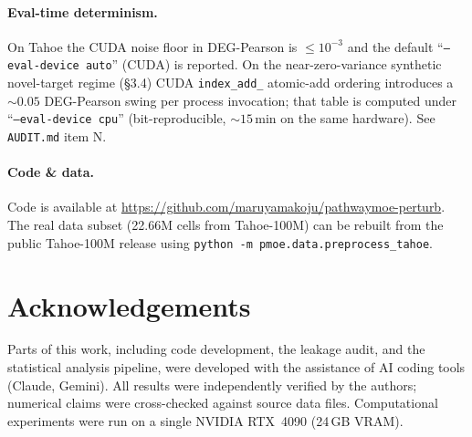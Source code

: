 \documentclass[11pt]{article}
\begin{document}
\paragraph{Eval-time determinism.} On Tahoe the CUDA noise floor in DEG-Pearson is $\!\leq\!10^{-3}$ and the
default ``\texttt{--eval-device auto}'' (CUDA) is reported. On the near-zero-variance synthetic
novel-target regime (\S3.4) CUDA \texttt{index\_add\_} atomic-add ordering introduces a $\sim\!0.05$
DEG-Pearson swing per process invocation; that table is computed under
``\texttt{--eval-device cpu}'' (bit-reproducible, $\sim\!15$\,min on the same hardware). See
\texttt{AUDIT.md} item N.

\paragraph{Code \& data.}
Code is available at \url{https://github.com/maruyamakoju/pathwaymoe-perturb}.
The real data subset (22.66M cells from Tahoe-100M) can be rebuilt from the public Tahoe-100M release
using \texttt{python -m pmoe.data.preprocess\_tahoe}.

\section*{Acknowledgements}
Parts of this work, including code development, the leakage audit, and the statistical analysis
pipeline, were developed with the assistance of AI coding tools (Claude, Gemini). All results were
independently verified by the authors; numerical claims were cross-checked against source data files.
Computational experiments were run on a single NVIDIA RTX~4090 (24\,GB VRAM).



\end{document}

